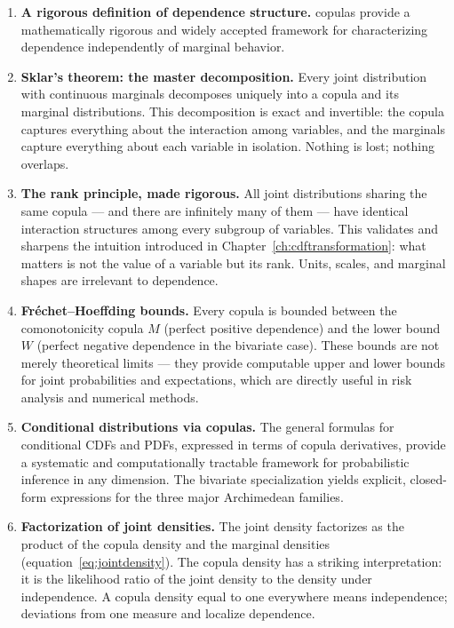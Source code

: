 \begin{enumerate}

\item \textbf{A rigorous definition of dependence structure.} copulas provide a mathematically rigorous and widely accepted framework for
characterizing dependence independently of marginal behavior.

\item \textbf{Sklar's theorem: the master decomposition.} Every joint distribution
with continuous marginals decomposes uniquely into a copula and its marginal
distributions. This decomposition is exact and invertible: the copula captures
everything about the interaction among variables, and the marginals capture everything
about each variable in isolation. Nothing is lost; nothing overlaps.

\item \textbf{The rank principle, made rigorous.} All joint distributions sharing the
same copula — and there are infinitely many of them — have identical interaction
structures among every subgroup of variables. This validates and sharpens the
intuition introduced in Chapter~\ref{ch:cdftransformation}: what matters is not the
value of a variable but its rank. Units, scales, and marginal shapes are irrelevant
to dependence.

\item \textbf{Fréchet–Hoeffding bounds.} Every copula is bounded between the
comonotonicity copula $M$ (perfect positive dependence) and the lower bound $W$
(perfect negative dependence in the bivariate case). These bounds are not merely
theoretical limits — they provide computable upper and lower bounds for joint
probabilities and expectations, which are directly useful in risk analysis and
numerical methods.

\item \textbf{Conditional distributions via copulas.} The general formulas for
conditional CDFs and PDFs, expressed in terms of copula derivatives, provide a
systematic and computationally tractable framework for probabilistic inference in
any dimension. The bivariate specialization yields explicit, closed-form expressions
for the three major Archimedean families.

\item \textbf{Factorization of joint densities.} The joint density factorizes as
the product of the copula density and the marginal densities
(equation~\eqref{eq:jointdensity}). The copula density has a striking interpretation:
it is the likelihood ratio of the joint density to the density under independence.
A copula density equal to one everywhere means independence; deviations from one
measure and localize dependence.


\end{enumerate}
